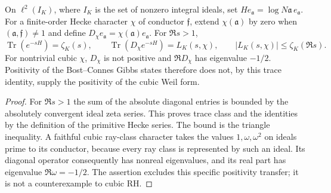 \begin{proposition}
\label{AC-K07}
On $\ell^2(I_K)$, where $I_K$ is the set of nonzero integral
ideals, set $H e_{\mathfrak a}=\log N\mathfrak a\,e_{\mathfrak a}$.
For a finite-order Hecke character $\chi$ of conductor
$\mathfrak f$, extend $\chi(\mathfrak a)$ by zero when
$(\mathfrak a,\mathfrak f)\ne1$ and define
$D_\chi e_{\mathfrak a}=\chi(\mathfrak a)e_{\mathfrak a}$.
For $\Re s>1$,
\[
 \operatorname{Tr}(e^{-sH})=\zeta_K(s),\qquad
 \operatorname{Tr}(D_\chi e^{-sH})=L_K(s,\chi),\qquad
 |L_K(s,\chi)|\le\zeta_K(\Re s).
\]
For nontrivial cubic $\chi$, $D_\chi$ is not positive and
$\Re D_\chi$ has eigenvalue $-1/2$. Positivity of the
Bost--Connes Gibbs states therefore does not, by this trace
identity, supply the positivity of the cubic Weil form.
\end{proposition}
\begin{proof}
For $\Re s>1$ the sum of the absolute diagonal entries is
bounded by the absolutely convergent ideal zeta series. This
proves trace class and the identities by the definition of
the primitive Hecke series. The bound is the triangle
inequality. A faithful cubic ray-class character takes the
values $1,\omega,\omega^2$ on ideals prime to its conductor,
because every ray class is represented by such an ideal.
Its diagonal operator consequently has nonreal eigenvalues,
and its real part has eigenvalue $\Re\omega=-1/2$.
The assertion excludes this specific positivity transfer;
it is not a counterexample to cubic RH.
\end{proof}

